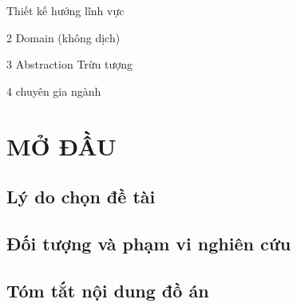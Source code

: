 Thiết kế hướng lĩnh vực

2 Domain (không dịch)

3 Abstraction Trừu tượng

4 chuyên gia ngành


\chapter*{\centering MỞ ĐẦU}


\section*{Lý do chọn đề tài}



\section*{Đối tượng và phạm vi nghiên cứu}



\section*{Tóm tắt nội dung đồ án}

